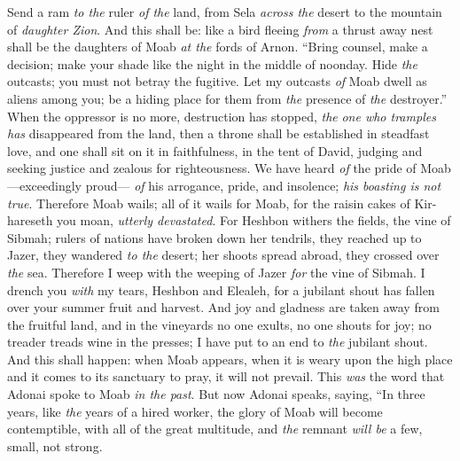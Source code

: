 \begin{biblechapter} %
\verse Send a ram \textit{to the} ruler \textit{of the} land, 
from Sela \textit{across the} desert to the mountain of \textit{daughter Zion}.
\verse And this shall be:
\verse like a bird fleeing \textit{from} a thrust away nest 
shall be the daughters of Moab \textit{at the} fords of Arnon.
\verse “Bring counsel, 
make a decision; 
make your shade like the night 
in the middle of noonday. 
Hide \textit{the} outcasts; 
you must not betray the fugitive.
\verse Let my outcasts \textit{of} Moab dwell as aliens among you; 
be a hiding place for them from \textit{the} presence of \textit{the} destroyer.” 
When the oppressor is no more, destruction has stopped, 
\textit{the} \textit{one who tramples has} disappeared from the land,
\verse then a throne shall be established in steadfast love, 
and one shall sit on it in faithfulness, in the tent of David, 
judging and seeking justice 
and zealous for righteousness.
\verse We have heard \textit{of} the pride of Moab—exceedingly proud— 
\textit{of} his arrogance, pride, and insolence; \textit{his boasting is not true}.
\verse Therefore Moab wails; 
all of it wails for Moab, 
for the raisin cakes of Kir-hareseth you moan, \textit{utterly devastated}.
\verse For Heshbon withers the fields, the vine of Sibmah; 
rulers of nations have broken down her tendrils, 
they reached up to Jazer, 
they wandered \textit{to the} desert; 
her shoots spread abroad, 
they crossed over \textit{the} sea.
\verse Therefore I weep with the weeping of Jazer \textit{for} the vine of Sibmah. 
I drench you \textit{with} my tears, Heshbon and Elealeh, 
for a jubilant shout has fallen over your summer fruit and harvest.
\verse And joy and gladness are taken away from the fruitful land, 
and in the vineyards no one exults, 
no one shouts for joy; 
no treader treads wine in the presses; 
I have put to an end to \textit{the} jubilant shout.
\verse And this shall happen: when Moab appears, when it is weary upon the high place 
and it comes to its sanctuary to pray, it will not prevail.
\verse This \textit{was} the word that Adonai spoke to Moab \textit{in the past}.
\verse But now Adonai speaks, saying, “In three years, like \textit{the} years of a hired worker, the glory of Moab will become contemptible, with all of the great multitude, and \textit{the} remnant \textit{will be} a few, small, not strong.
\end{biblechapter}

